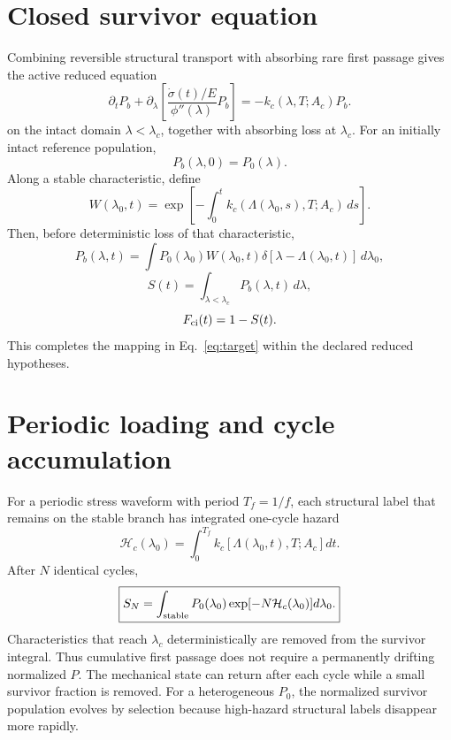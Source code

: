 \documentclass[11pt]{article}
\begin{document}
\section{Closed survivor equation}
Combining reversible structural transport with absorbing rare first passage gives the active reduced equation
\begin{equation}
\boxed{
\partial_tP_b
+\partial_\lambda\left[
\frac{\dot\sigma(t)/E}{\phi''(\lambda)}P_b
\right]
=-k_c(\lambda,T;A_c)P_b.
}
\label{eq:finalpde}
\end{equation}
on the intact domain $\lambda<\lambda_c$, together with absorbing loss at $\lambda_c$. For an initially intact reference population,
\begin{equation}
P_b(\lambda,0)=P_0(\lambda).
\end{equation}
Along a stable characteristic, define
\begin{equation}
W(\lambda_0,t)
=\exp\left[-\int_{0}^{t}
k_c(\Lambda(\lambda_0,s),T;A_c)\,ds\right].
\end{equation}
Then, before deterministic loss of that characteristic,
\begin{equation}
P_b(\lambda,t)
=\int P_0(\lambda_0)W(\lambda_0,t)
\delta[\lambda-\Lambda(\lambda_0,t)]\,d\lambda_0,
\label{eq:charsol}
\end{equation}
\begin{equation}
S(t)=\int_{\lambda<\lambda_c} P_b(\lambda,t)\,d\lambda,
\end{equation}
\begin{equation}
F_{\rm ci}(t)=1-S(t).
\end{equation}
This completes the mapping in Eq.~\eqref{eq:target} within the declared reduced hypotheses.

\section{Periodic loading and cycle accumulation}
For a periodic stress waveform with period $T_f=1/f$, each structural label that remains on the stable branch has integrated one-cycle hazard
\begin{equation}
\mathcal H_c(\lambda_0)
=\int_0^{T_f}k_c[\Lambda(\lambda_0,t),T;A_c]dt.
\end{equation}
After $N$ identical cycles,
\begin{equation}
\boxed{
S_N=\int_{\rm stable} P_0(\lambda_0)
\exp[-N\mathcal H_c(\lambda_0)]d\lambda_0.
}
\label{eq:SN}
\end{equation}
Characteristics that reach $\lambda_c$ deterministically are removed from the survivor integral. Thus cumulative first passage does not require a permanently drifting normalized $P$. The mechanical state can return after each cycle while a small survivor fraction is removed. For a heterogeneous $P_0$, the normalized survivor population evolves by selection because high-hazard structural labels disappear more rapidly.
\end{document}
